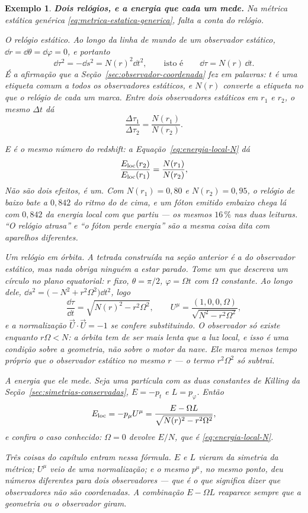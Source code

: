 \documentclass[12pt,a4paper,oneside]{book}
\theoremstyle{rgplain}
\newtheorem{example}{Exemplo}[chapter]
\theoremstyle{rgremark}
\begin{document}
\begin{example}
\textbf{Dois relógios, e a energia que cada um mede.} Na métrica estática
genérica \eqref{eq:metrica-estatica-generica}, falta a conta do relógio.

\emph{O relógio estático.} Ao longo da linha de mundo de um observador
estático, $\dd r=\dd\theta=\dd\varphi=0$, e portanto
\[
  \dd\tau^2=-\dd s^2=N(r)^2\dd t^2 ,
  \qquad\text{isto é}\qquad
  \dd\tau=N(r)\,\dd t .
\]
É a afirmação que a Seção~\ref{sec:observador-coordenada} fez em palavras: $t$
é uma etiqueta comum a todos os observadores estáticos, e $N(r)$ converte a
etiqueta no que o relógio de cada um marca.
Entre dois observadores estáticos em $r_1$ e $r_2$, o mesmo $\Delta t$ dá
\[
  \frac{\Delta\tau_1}{\Delta\tau_2}=\frac{N(r_1)}{N(r_2)} .
\]

E é o mesmo número do redshift: a Equação~\eqref{eq:energia-local-N} dá
\[
  \frac{E_{\rm loc}(r_2)}{E_{\rm loc}(r_1)}=\frac{N(r_1)}{N(r_2)} ,
\]
Não são dois efeitos, é um. Com $N(r_1)=0{,}80$ e
$N(r_2)=0{,}95$, o relógio de baixo bate a $0{,}842$ do ritmo do de cima, e um
fóton emitido embaixo chega lá com $0{,}842$ da energia local com que partiu ---
os mesmos $16\,\%$ nas duas leituras. ``O relógio atrasa'' e ``o fóton perde
energia'' são a mesma coisa dita com aparelhos diferentes.

\emph{Um relógio em órbita.} A tetrada construída na seção anterior é a do
observador estático, mas nada obriga ninguém a estar parado. Tome um que
descreva um círculo no plano equatorial: $r$ fixo, $\theta=\pi/2$,
$\varphi=\Omega t$ com $\Omega$ constante. Ao longo dele,
$\dd s^2=\bigl(-N^2+r^2\Omega^2\bigr)\dd t^2$, logo
\begin{equation}
  \frac{\dd\tau}{\dd t}=\sqrt{N(r)^2-r^2\Omega^2} ,
  \qquad
  U^\mu=\frac{(1,0,0,\Omega)}{\sqrt{N^2-r^2\Omega^2}} ,
  \label{eq:observador-orbital}
\end{equation}
e a normalização $\vec U\cdot\vec U=-1$ se confere substituindo. O observador
só \emph{existe} enquanto $r\Omega<N$: a órbita tem de ser mais lenta que a luz
local, e isso é uma condição sobre a geometria, não sobre o motor da nave. Ele
marca menos tempo próprio que o observador estático no mesmo $r$ --- o termo
$r^2\Omega^2$ só subtrai.

\emph{A energia que ele mede.} Seja uma partícula com as duas constantes de
Killing da Seção~\ref{sec:simetrias-conservadas}, $E=-p_t$ e $L=p_\varphi$.
Então
\begin{equation}
  E_{\rm loc}=-p_\mu U^\mu
  =\frac{E-\Omega L}{\sqrt{N(r)^2-r^2\Omega^2}} ,
  \label{eq:energia-local-orbital}
\end{equation}
e confira o caso conhecido: $\Omega=0$ devolve $E/N$, que é
\eqref{eq:energia-local-N}.

Três coisas do capítulo entram nessa fórmula. $E$ e $L$ vieram da
simetria da métrica; $U^\mu$ veio de uma normalização; e o \emph{mesmo}
$p^\mu$, no \emph{mesmo} ponto, deu números diferentes para dois observadores
--- que é o que significa dizer que observadores não são
coordenadas. A combinação $E-\Omega L$ reaparece sempre que a geometria ou o
observador giram.
\end{example}
\end{document}
